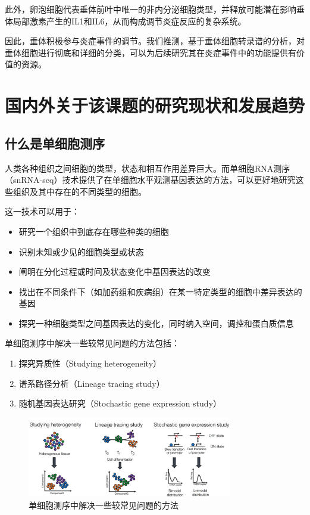 \documentclass[class = opening]{whuthesis}
\begin{document}
  此外，卵泡细胞代表垂体前叶中唯一的非内分泌细胞类型，并释放可能潜在影响垂体局部激素产生的IL1和IL6，从而构成调节炎症反应的复杂系统。

  因此，垂体积极参与炎症事件的调节。我们推测，基于垂体细胞转录谱的分析，对垂体细胞进行彻底和详细的分类，可以为后续研究其在炎症事件中的功能提供有价值的资源。
\section{国内外关于该课题的研究现状和发展趋势}
\subsection{什么是单细胞测序}
  人类各种组织之间细胞的类型，状态和相互作用差异巨大。而单细胞RNA测序（snRNA-seq）技术提供了在单细胞水平观测基因表达的方法，可以更好地研究这些组织及其中存在的不同类型的细胞。

  这一技术可以用于：
\begin{itemize}
    \item 研究一个组织中到底存在哪些种类的细胞
    \item 识别未知或少见的细胞类型或状态
    \item 阐明在分化过程或时间及状态变化中基因表达的改变
    \item 找出在不同条件下（如加药组和疾病组）在某一特定类型的细胞中差异表达的基因
    \item 探究一种细胞类型之间基因表达的变化，同时纳入空间，调控和蛋白质信息
\end{itemize}

  单细胞测序中解决一些较常见问题的方法\cite{liu2016single,junker2014every}包括：
\begin{enumerate}
    \item 探究异质性（Studying heterogeneity）
    \item 谱系路径分析（Lineage tracing study）
    \item 随机基因表达研究（Stochastic gene expression study）
\end{enumerate}

\begin{figure}[!htb]
  \centering
  \includegraphics[width=0.8\textwidth]{figs/scseq-purpose.png}
  \caption{单细胞测序中解决一些较常见问题的方法}
  \label{fig:scseq-purpose}
\end{figure}
\end{document}
